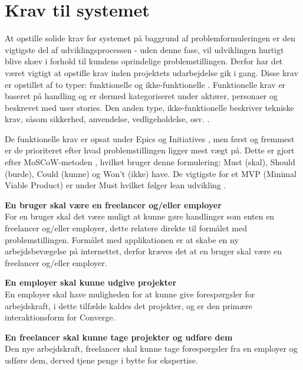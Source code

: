 \section{Krav til systemet}
\label{sec:system-requirements}

At opstille solide krav for systemet på baggrund af problemformuleringen er den vigtigste del af udviklingsprocessen \cite[Udviklingsprocessen]{converge-terms} - uden denne fase, vil udviklingen hurtigt blive skæv i forhold til kundens oprindelige problemstillingen. Derfor har det været vigtigt at opstille krav inden projektets udarbejdelse gik i gang. Disse krav er opstillet af to typer: funktionelle og ikke-funktionelle \cite[Funktionelle/ikke-funktionelle]{converge-terms}. Funktionelle krav er baseret på handling og er dermed kategoriseret under aktører, personaer og beskrevet med user stories. Den anden type, ikke-funktionelle beskriver tekniske krav, såsom sikkerhed, anvendelse, vedligeholdelse, osv. \cite[non-functional]{documentation-kravspec}. 

De funktionelle krav er opsat under Epics og Initiatives \cite[Initiatives]{converge-terms}, men først og fremmest er de prioriteret efter hvad problemstillingen ligger mest vægt på. Dette er gjort efter MoSCoW-metoden \cite[MoSCoW]{converge-terms}, hvilket bruger denne formulering: Must (skal), Should (burde), Could (kunne) og Won’t (ikke) have. De vigtigste for et MVP (Minimal Viable Product) \cite[MVP]{converge-terms} er under Must hvilket følger lean udvikling \cite[Lean]{converge-terms}.

\textbf{En bruger skal være en freelancer og/eller employer} \\
For en bruger skal det være muligt at kunne gøre handlinger som enten en freelancer og/eller employer, dette relatere direkte til formålet med problemstillingen. Formålet med applikationen er at skabe en ny arbejdsbevægelse på internettet, derfor kræves det at en bruger skal være en freelancer og/eller employer.

\textbf{En employer skal kunne udgive projekter} \\
En employer skal have muligheden for at kunne give forespørgsler for arbejdskraft, i dette tilfælde kaldes det projekter, og er den primære interaktionsform for Converge.

\textbf{En freelancer skal kunne tage projekter og udføre dem} \\
Den nye arbejdskraft, freelancer skal kunne tage forespørgsler fra en employer og udføre dem, derved tjene penge i bytte for ekspertise.

